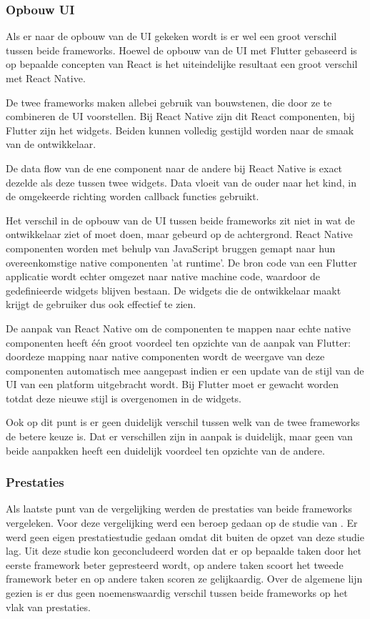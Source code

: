 \subsubsection{Opbouw UI}

Als er naar de opbouw van de UI gekeken wordt is er wel een groot verschil tussen beide frameworks. Hoewel de opbouw van de UI met Flutter gebaseerd is op bepaalde concepten van React is het uiteindelijke resultaat een groot verschil met React Native.

De twee frameworks maken allebei gebruik van bouwstenen, die door ze te combineren de UI voorstellen. Bij React Native zijn dit React componenten, bij Flutter zijn het widgets. Beiden kunnen volledig gestijld worden naar de smaak van de ontwikkelaar. 

De data flow van de ene component naar de andere bij React Native is exact dezelde als deze tussen twee widgets. Data vloeit van de ouder naar het kind, in de omgekeerde richting worden callback functies gebruikt.

Het verschil in de opbouw van de UI tussen beide frameworks zit niet in wat de ontwikkelaar ziet of moet doen, maar gebeurd op de achtergrond. React Native componenten worden met behulp van JavaScript bruggen gemapt naar hun overeenkomstige native componenten 'at runtime'. De bron code van een Flutter applicatie wordt echter omgezet naar native machine code, waardoor de gedefinieerde widgets blijven bestaan. De widgets die de ontwikkelaar maakt krijgt de gebruiker dus ook effectief te zien. 

De aanpak van React Native om de componenten te mappen naar echte native componenten heeft één groot voordeel ten opzichte van de aanpak van Flutter: doordeze mapping naar native componenten wordt de weergave van deze componenten automatisch mee aangepast indien er een update van de stijl van de UI van een platform uitgebracht wordt. Bij Flutter moet er gewacht worden totdat deze nieuwe stijl is overgenomen in de widgets. 

Ook op dit punt is er geen duidelijk verschil tussen welk van de twee frameworks de betere keuze is. Dat er verschillen zijn in aanpak is duidelijk, maar geen van beide aanpakken heeft een duidelijk voordeel ten opzichte van de andere. 

\subsubsection{Prestaties}

Als laatste punt van de vergelijking werden de prestaties van beide frameworks vergeleken. Voor deze vergelijking werd een beroep gedaan op de studie van \textcite{Fentaw2020}. Er werd geen eigen prestatiestudie gedaan omdat dit buiten de opzet van deze studie lag. Uit deze studie kon geconcludeerd worden dat er op bepaalde taken door het eerste framework beter gepresteerd wordt, op andere taken scoort het tweede framework beter en op andere taken scoren ze gelijkaardig. Over de algemene lijn gezien is er dus geen noemenswaardig verschil tussen beide frameworks op het vlak van prestaties.

